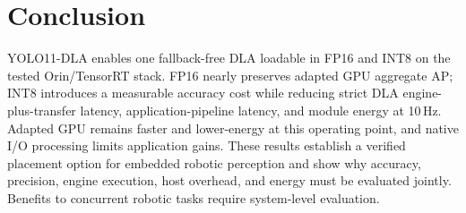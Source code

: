 \section{Conclusion}
YOLO11-DLA enables one fallback-free DLA loadable in FP16 and INT8 on the
tested Orin/TensorRT stack. FP16 nearly preserves adapted GPU aggregate AP;
INT8 introduces a measurable accuracy cost while reducing strict DLA
engine-plus-transfer latency, application-pipeline latency, and module energy
at 10\,Hz. Adapted GPU remains faster and lower-energy at this operating point,
and native I/O processing limits application gains.
These results establish a verified placement option for embedded robotic
perception and show why accuracy, precision, engine execution, host overhead,
and energy must be evaluated jointly. Benefits to concurrent robotic tasks
require system-level evaluation.
